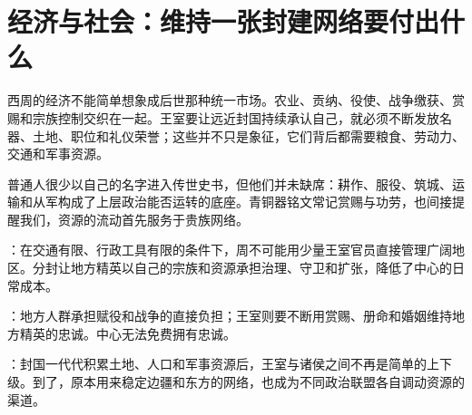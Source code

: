 \section{经济与社会：维持一张封建网络要付出什么}

西周的经济不能简单想象成后世那种统一市场。农业、贡纳、役使、战争缴获、赏赐和宗族控制交织在一起。王室要让远近封国持续承认自己，就必须不断发放名器、土地、职位和礼仪荣誉；这些并不只是象征，它们背后都需要粮食、劳动力、交通和军事资源。

普通人很少以自己的名字进入传世史书，但他们并未缺席：耕作、服役、筑城、运输和从军构成了上层政治能否运转的底座。青铜器铭文常记赏赐与功劳，也间接提醒我们，资源的流动首先服务于贵族网络。

\begin{turningpoint}
：在交通有限、行政工具有限的条件下，周不可能用少量王室官员直接管理广阔地区。分封让地方精英以自己的宗族和资源承担治理、守卫和扩张，降低了中心的日常成本。

：地方人群承担赋役和战争的直接负担；王室则要不断用赏赐、册命和婚姻维持地方精英的忠诚。中心无法免费拥有忠诚。

：封国一代代积累土地、人口和军事资源后，王室与诸侯之间不再是简单的上下级。到了，原本用来稳定边疆和东方的网络，也成为不同政治联盟各自调动资源的渠道。
\end{turningpoint}
